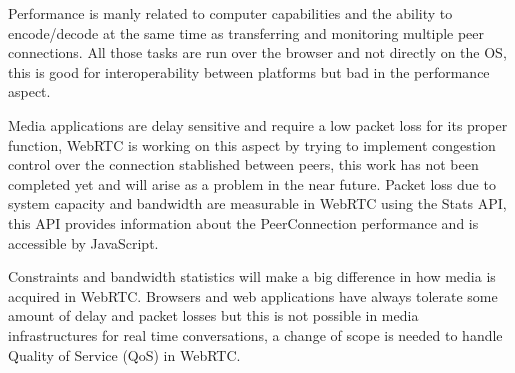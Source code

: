 Performance is manly related to computer capabilities and the ability to encode/decode at the same time as transferring and monitoring multiple peer connections. All those tasks are run over the browser and not directly on the OS, this is good for interoperability between platforms but bad in the performance aspect. 

Media applications are delay sensitive and require a low packet loss for its proper function, WebRTC is working on this aspect by trying to implement congestion control over the connection stablished between peers, this work has not been completed yet and will arise as a problem in the near future. Packet loss due to system capacity and bandwidth are measurable in WebRTC using the Stats API, this API provides information about the PeerConnection performance and is accessible by JavaScript.

Constraints and bandwidth statistics will make a big difference in how media is acquired in WebRTC. Browsers and web applications have always tolerate some amount of delay and packet losses but this is not possible in media infrastructures for real time conversations, a change of scope is needed to handle Quality of Service (QoS) in WebRTC.

